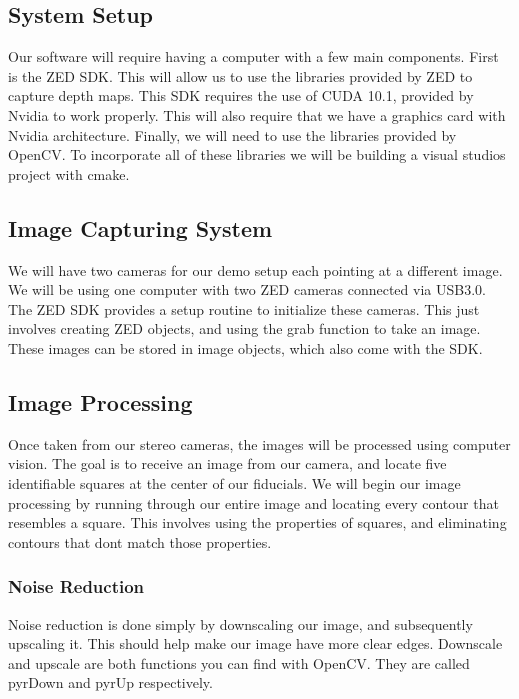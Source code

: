 \documentclass[onecolumn, draftclsnofoot,10pt, compsoc]{IEEEtran}
\begin{document}
\subsection{System Setup}
Our software will require having a computer with a few main components. First is the ZED SDK. This will allow us to use the libraries provided by ZED to capture depth maps. This SDK requires the use of CUDA 10.1, provided by Nvidia to work properly. This will also require that we have a graphics card with Nvidia architecture. Finally, we will need to use the libraries provided by OpenCV. To incorporate all of these libraries we will be building a visual studios project with cmake. 

\subsection{Image Capturing System}
We will have two cameras for our demo setup each pointing at a different image. We will be using one computer with two ZED cameras connected via USB3.0. The ZED SDK provides a setup routine to initialize these cameras.  This just involves creating ZED objects, and using the grab function to take an image.  These images can be stored in image objects, which also come with the SDK.

\subsection{Image Processing}
Once taken from our stereo cameras, the images will be processed using computer vision.  The goal is to receive an image from our camera, and locate five identifiable squares at the center of our fiducials.
We will begin our image processing by running through our entire image and locating every contour that resembles a square.  This involves using the properties of squares, and eliminating contours that dont match those properties.
\subsubsection{Noise Reduction}
Noise reduction is done simply by downscaling our image, and subsequently upscaling it.  This should help make our image have more clear edges.  Downscale and upscale are both functions you can find with OpenCV. They are called pyrDown and pyrUp respectively.
\end{document}
